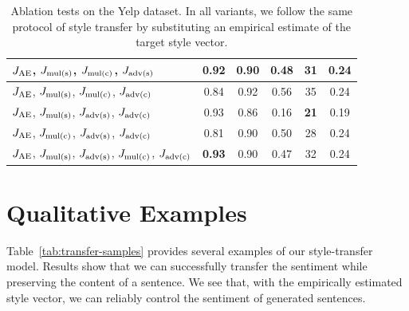\documentclass[letterpaper]{article}
\begin{document}
\begin{table}[ht]
\begin{tabular}{| l || c | c | c | c || c |}
		$J_{\text{AE}}$, $J_{\text{mul(s)}}$, $J_{\text{mul(c)}}$, $J_{\text{adv(s)}}$                  & 0.92          & 0.90          & 0.48          & 31           & 0.24          \\ \hline
		$J_{\text{AE}}$, $J_{\text{mul(s)}}$, $J_{\text{mul(c)}}$, $J_{\text{adv(c)}}$                  & 0.84          & 0.92          & 0.56          & 35           & 0.24          \\ \hline
		$J_{\text{AE}}$, $J_{\text{mul(s)}}$, $J_{\text{adv(s)}}$, $J_{\text{adv(c)}}$                  & 0.93          & 0.86          & 0.16          & \textbf{21}  & 0.19          \\ \hline
		$J_{\text{AE}}$, $J_{\text{mul(c)}}$, $J_{\text{adv(s)}}$, $J_{\text{adv(c)}}$                  & 0.81          & 0.90          & 0.50          & 28           & 0.24          \\ \hline
		$J_{\text{AE}}$, $J_{\text{mul(s)}}$, $J_{\text{adv(s)}}$, $J_{\text{mul(c)}}$, $J_{\text{adv(c)}}$ & \textbf{0.93} & 0.90          & 0.47          & 32           & 0.24          \\ \hline
	\end{tabular}
	\caption{Ablation tests on the Yelp dataset. In all variants, we follow the same protocol of style transfer by substituting an empirical estimate of the target style vector.}
	\label{tab:ablation-results}
\end{table}

\section{Qualitative Examples}

Table~\ref{tab:transfer-samples} provides several examples of our style-transfer model.
Results show that we can successfully transfer the sentiment while preserving the content of a sentence.
We see that, with the empirically estimated style vector, we can reliably control the sentiment of generated sentences.
\end{document}

